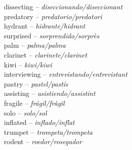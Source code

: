 \documentclass[output=paper,modfonts,nonflat,newtxmath]{langsci/langscibook}
\begin{document}
dissecting  – \textit{diseccionando/diseccionant}\\
predatory  – \textit{predatorio/predatori} \\
hydrant  – \textit{hidrante/hidrant} \\
surprised  – \textit{sorprendido/sorprès}\\
palm   – \textit{palma/palma} \\
clarinet  – \textit{clarinete/clarinet} \\
kiwi  – \textit{kiwi/kiwi} \\
interviewing – \textit{entrevistando/entrevistant} \\
pastry – \textit{pastel/pastís}\\
assisting  – \textit{asistiendo/assistint}  \\
fragile  – \textit{frágil/fràgil} \\
solo  – \textit{solo/sol} \\
inflated  – \textit{inflado/inflat} \\
trumpet  – \textit{trompeta/trompeta} \\
rodent  – \textit{roedor/rosegador}


\sloppy\printbibliography[heading=subbibliography,notkeyword=this]
\end{document}
